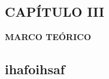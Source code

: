 \begin{center}
    \setcounter{section}{3}
    \section*{CAPÍTULO III}
    \vspace*{0.5in}
    \textbf{MARCO TEÓRICO}
\end{center}
\setcounter{subsection}{0}
\subsection{ihafoihsaf}
\newpage